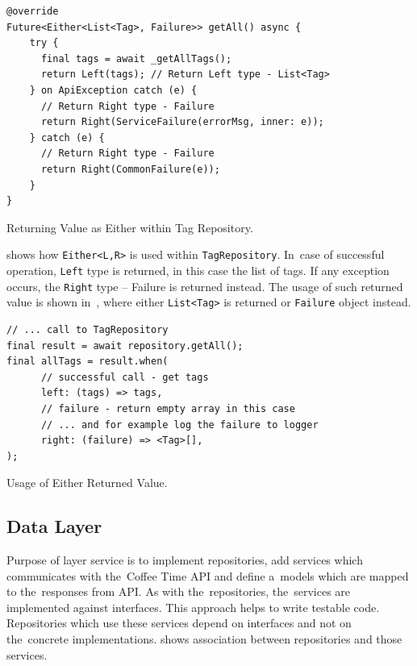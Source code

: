 \begin{listing}[ht]
\begin{verbatim}
@override
Future<Either<List<Tag>, Failure>> getAll() async {
    try {
      final tags = await _getAllTags();
      return Left(tags); // Return Left type - List<Tag>
    } on ApiException catch (e) {
      // Return Right type - Failure
      return Right(ServiceFailure(errorMsg, inner: e));
    } catch (e) {
      // Return Right type - Failure
      return Right(CommonFailure(e));
    }
}
\end{verbatim}
\caption{Returning Value as Either within Tag Repository.}
\label{listing:ct-either-repo}
\end{listing}

 shows how \verb|Either<L,R>| is used within \verb|TagRepository|. In~case of successful operation, \verb|Left| type is returned, in this case the list of tags. If any exception occurs, the \verb|Right| type -- Failure is returned instead. The usage of such returned value is shown in~, where either \verb|List<Tag>| is returned or \verb|Failure| object instead.   

\begin{listing}[ht]
\begin{verbatim}
// ... call to TagRepository
final result = await repository.getAll();
final allTags = result.when(
      // successful call - get tags
      left: (tags) => tags,
      // failure - return empty array in this case
      // ... and for example log the failure to logger
      right: (failure) => <Tag>[], 
);
\end{verbatim}
\caption{Usage of Either Returned Value.}
\label{listing:ct-either-usage}
\end{listing}

\subsection{Data Layer}
Purpose of layer service is to implement repositories, add services which communicates with the~Coffee Time API and define a~models which are mapped to the~responses from API. As with the~repositories, the~services are implemented against interfaces. This approach helps to write testable code. Repositories which use these services depend on interfaces and not on the~concrete implementations.  shows association between repositories and those services. 

